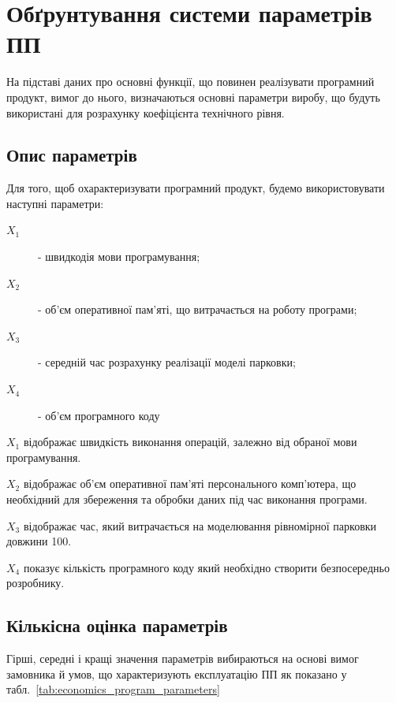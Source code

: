 \section{Обґрунтування системи параметрів ПП}
На підставі даних про основні функції, що повинен реалізувати програмний продукт, вимог до нього, визначаються основні параметри виробу, що будуть використані для розрахунку коефіцієнта технічного рівня.

\subsection{Опис параметрів}

Для того, щоб охарактеризувати програмний продукт, будемо використовувати наступні параметри:
\begin{description}
	\item[$X_1$] - швидкодія мови програмування;
	\item[$X_2$] - об'єм оперативної пам'яті, що витрачається на роботу програми;
	\item[$X_3$] - середній час розрахунку реалізації моделі парковки;
	\item[$X_4$] - об'єм програмного коду
\end{description}

$X_1$ відображає швидкість виконання операцій, залежно від обраної мови програмування. 

$X_2$ відображає об'єм оперативної пам'яті персонального комп'ютера, що необхідний для збереження та обробки даних під час виконання програми.

$X_3$ відображає час, який витрачається на моделювання рівномірної парковки довжини 100.

$X_4$ показує кількість програмного коду який необхідно створити безпосередньо розробнику. 

\subsection{Кількісна оцінка параметрів}
Гірші, середні і кращі значення параметрів вибираються на основі вимог замовника й умов, що характеризують експлуатацію ПП як показано у табл.~\ref*{tab:economics_program_parameters}


